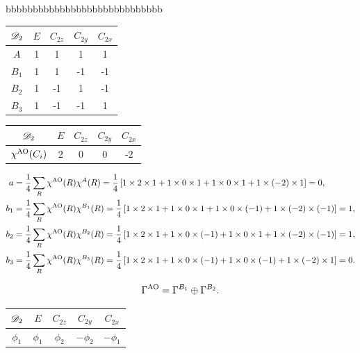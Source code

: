 		
		bbbbbbbbbbbbbbbbbbbbbbbbbbbbb
		
		\begin{center}
		\begin{tabular}{ccccc}\hline
	$\mathscr{D}_{\rm 2}$ & $E$ & $C_{2z}$ & $C_{2y}$ & $C_{2x}$ \\ \hline
			$A$		&	1	&	1	&	1	&	1	\\
			$B_1$	&	1	&	1	&	-1	&	-1	\\
			$B_2$	&	1	&	-1	&	1	&	-1	\\
			$B_3$ 	&	1	&	-1	&	-1	&	1	\\ \hline
		\end{tabular}
		\end{center}
		
		
		\begin{center}
		\begin{tabular}{ccccc}\hline
	$\mathscr{D}_{\rm 2}$ & $E$ & $C_{2z}$ & $C_{2y}$ & $C_{2x}$  \\ \hline
	$\chi^{{\rm AO}}(C_i)$	&	2	&	0	&	0	&	-2	\\ \hline
		\end{tabular}
		\end{center}
		
		\begin{align*}
		a &= \frac{1}{4} \sum_{R} \chi^{{\rm AO}}(R) \chi^{A}(R) = \frac{1}{4} \left[ 1 \times 2 \times 1 + 1 \times 0 \times 1 + 1 \times 0 \times 1 + 1 \times (-2) \times 1 \right] = 0, \\
		b_1	&= \frac{1}{4} \sum_{R} \chi^{{\rm AO}}(R) \chi^{B_1}(R) = \frac{1}{4} \left[ 1 \times 2 \times 1 + 1 \times 0 \times 1 + 1 \times 0 \times (-1) + 1 \times (-2) \times (-1) \right] = 1, \\
		b_2	&= \frac{1}{4} \sum_{R} \chi^{{\rm AO}}(R) \chi^{B_2}(R) = \frac{1}{4} \left[ 1 \times 2 \times 1 + 1 \times 0 \times (-1) + 1 \times 0 \times 1 + 1 \times (-2) \times (-1) \right] = 1, \\
		b_3	&= \frac{1}{4} \sum_{R} \chi^{{\rm AO}}(R) \chi^{B_3}(R) = \frac{1}{4} \left[ 1 \times 2 \times 1 + 1 \times 0 \times (-1) + 1 \times 0 \times (-1) + 1 \times (-2) \times 1 \right] = 0.
		\end{align*}
		
		\begin{equation*}
			\Gamma^{{\rm AO}} = \Gamma^{B_1} \oplus \Gamma^{B_2}.
		\end{equation*}
		
		\begin{center}
		\begin{tabular}{ccccc}\hline
	$\mathscr{D}_{\rm 2}$ & $E$ & $C_{2z}$ & $C_{2y}$ & $C_{2x}$ \\ \hline
			$\phi_1$	&	$\phi_1$	&	$\phi_2$	&	$-\phi_2$	&	$-\phi_1$	\\	\hline
		\end{tabular}
		\end{center}
		
